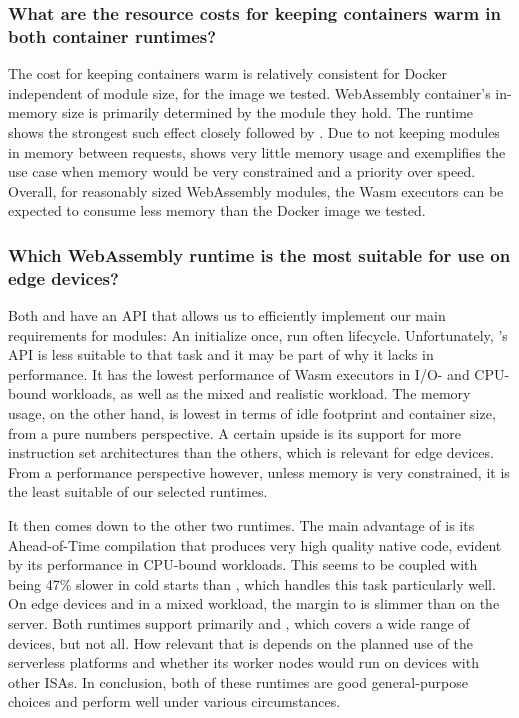 \subsubsection*{What are the resource costs for keeping containers warm in both container runtimes?}

The cost for keeping containers warm is relatively consistent for Docker independent of module size, for the image we tested. WebAssembly container's in-memory size is primarily determined by the module they hold. The  runtime shows the strongest such effect closely followed by . Due to not keeping modules in memory between requests,  shows very little memory usage and exemplifies the use case when memory would be very constrained and a priority over speed. Overall, for reasonably sized WebAssembly modules, the Wasm executors can be expected to consume less memory than the Docker image we tested.

\subsubsection*{Which WebAssembly runtime is the most suitable for use on edge devices?}

Both  and  have an API that allows us to efficiently implement our main requirements for modules: An initialize once, run often lifecycle. Unfortunately, 's API is less suitable to that task and it may be part of why it lacks in performance. It has the lowest performance of Wasm executors in I/O- and CPU-bound workloads, as well as the mixed and realistic workload. The memory usage, on the other hand, is lowest in terms of idle footprint and container size, from a pure numbers perspective. A certain upside is its support for more instruction set architectures than the others, which is relevant for edge devices. From a performance perspective however, unless memory is very constrained, it is the least suitable of our selected runtimes.

It then comes down to the other two runtimes. The main advantage of  is its Ahead-of-Time compilation that produces very high quality native code, evident by its performance in CPU-bound workloads. This seems to be coupled with being 47\% slower in cold starts than , which handles this task particularly well. On edge devices and in a mixed workload, the margin to  is slimmer than on the server. Both runtimes support primarily  and , which covers a wide range of devices, but not all. How relevant that is depends on the planned use of the serverless platforms and whether its worker nodes would run on devices with other ISAs.
In conclusion, both of these runtimes are good general-purpose choices and perform well under various circumstances.

